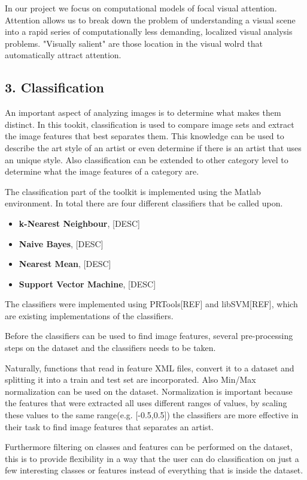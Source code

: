 In our project we focus on computational models of focal visual attention. Attention allows us to break down the problem of understanding a visual scene into a rapid series of computationally less demanding, localized visual analysis problems. 
"Visually salient" are those location in the visual wolrd that automatically attract attention.

\subsection{3. Classification}
An important aspect of analyzing images is to determine what makes them distinct.
In this tookit, classification is used to compare image sets and extract the image features that best separates them.
This knowledge can be used to describe the art style of an artist or even determine if there is an artist that uses an unique style.
Also classification can be extended to other category level to determine what the image features of a category are.

The classification part of the toolkit is implemented using the Matlab environment. In total there are four different classifiers that be called upon.

\begin{itemize}
	\item \textbf{k-Nearest Neighbour}, [DESC]
	\item \textbf{Naive Bayes}, [DESC]
	\item \textbf{Nearest Mean}, [DESC]
	\item \textbf{Support Vector Machine}, [DESC]
\end{itemize}

The classifiers were implemented using PRTools[REF] and libSVM[REF], which are existing implementations of the classifiers.

Before the classifiers can be used to find image features, several pre-processing steps on the dataset and the classifiers needs to be taken.

Naturally, functions that read in feature XML files, convert it to a dataset and splitting it into a train and test set are incorporated.
Also Min/Max normalization can be used on the dataset.
Normalization is important because the features that were extracted all uses different ranges of values, by scaling these values to the same range(e.g. [-0.5,0.5]) the classifiers are more effective in their task to find image features that separates an artist.

Furthermore filtering on classes and features can be performed on the dataset, this is to provide flexibility in a way that the user can do classification on just a few interesting classes or features instead of everything that is inside the dataset.

